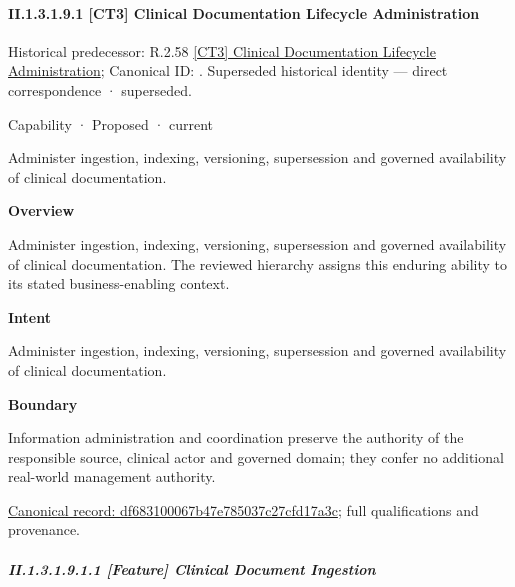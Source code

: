 \paragraph*{II.1.3.1.9.1 [CT3] Clinical Documentation Lifecycle Administration}
\label{navigation:II.1.3.1.9.1}

{\small Historical predecessor: R.2.58 \hyperref[element:5b1636373a8d4e788b3ddbc1659a47ef]{[CT3] Clinical Documentation Lifecycle Administration}; Canonical ID: \texttt{}. Superseded historical identity — direct correspondence · superseded.}\par
\label{element:df683100067b47e785037c27cfd17a3c}
{\small Capability · Proposed · current}\par

Administer ingestion, indexing, versioning, supersession and governed availability of clinical documentation.



\textbf{Overview}



Administer ingestion, indexing, versioning, supersession and governed availability of clinical documentation. The reviewed hierarchy assigns this enduring ability to its stated business-enabling context.



\textbf{Intent}



Administer ingestion, indexing, versioning, supersession and governed availability of clinical documentation.



\textbf{Boundary}



Information administration and coordination preserve the authority of the responsible source, clinical actor and governed domain; they confer no additional real-world management authority.


{\footnotesize \href{../../../../../../../continuum/strategy/capability/df683100067b47e785037c27cfd17a3c.md}{Canonical record: df683100067b47e785037c27cfd17a3c}; full qualifications and provenance.}\par
\subparagraph*{II.1.3.1.9.1.1 [Feature] Clinical Document Ingestion}
\label{navigation:II.1.3.1.9.1.1}

